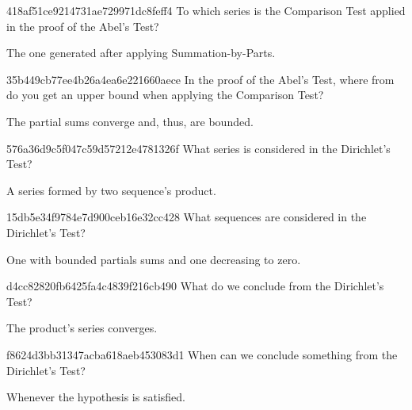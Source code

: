\begin{note}{418af51ce9214731ae729971dc8feff4}
    To which series is the Comparison Test applied in the proof of the Abel's Test?

    \begin{cloze}{1}
        The one generated after applying Summation-by-Parts.
    \end{cloze}
\end{note}

\begin{note}{35b449cb77ee4b26a4ea6e221660aece}
    In the proof of the Abel's Test, where from do you get an upper bound when applying the Comparison Test?

    \begin{cloze}{1}
        The partial sums converge and, thus, are bounded.
    \end{cloze}
\end{note}

\begin{note}{576a36d9c5f047c59d57212e4781326f}
    What series is considered in the Dirichlet's Test?

    \begin{cloze}{1}
        A series formed by two sequence's product.
    \end{cloze}
\end{note}

\begin{note}{15db5e34f9784e7d900ceb16e32cc428}
    What sequences are considered in the Dirichlet's Test?

    \begin{cloze}{1}
        One with bounded partials sums and one decreasing to zero.
    \end{cloze}
\end{note}

\begin{note}{d4cc82820fb6425fa4c4839f216cb490}
    What do we conclude from the Dirichlet's Test?

    \begin{cloze}{1}
        The product's series converges.
    \end{cloze}
\end{note}

\begin{note}{f8624d3bb31347acba618aeb453083d1}
    When can we conclude something from the Dirichlet's Test?

    \begin{cloze}{1}
        Whenever the hypothesis is satisfied.
    \end{cloze}
\end{note}

